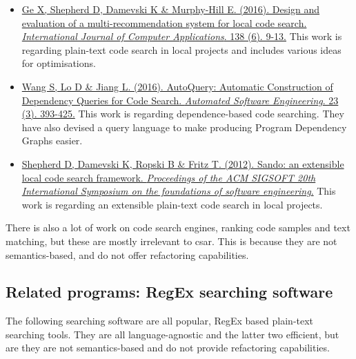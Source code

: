 \documentclass[12pt, letterpaper]{article}
\begin{document}
\begin{itemize}
  \item \href{http://www.sciencedirect.com.ezproxy.library.qmul.ac.uk/science/article/pii/S1045926X16300970?_rdoc=1&_fmt=high&_origin=gateway&_docanchor=&md5=b8429449ccfc9c30159a5f9aeaa92ffb&ccp=y}{Ge X, Shepherd D, Damevski K \& Murphy-Hill E. (2016). Design and evaluation of a multi-recommendation system for local code search. \textit{International Journal of Computer Applications}. 138 (6). 9-13.}\newline
  This work is regarding plain-text code search in local projects and includes various ideas for optimisations.
  \item \href{https://link-springer-com.ezproxy.library.qmul.ac.uk/article/10.1007%2Fs10515-014-0170-2}{Wang S, Lo D \& Jiang L. (2016). AutoQuery: Automatic Construction of Dependency Queries for Code Search. \textit{Automated Software Engineering}. 23 (3). 393-425.}\newline
  This work is regarding dependence-based code searching.
  They have also devised a query language to make producing Program Dependency Graphs easier.
  \item \href{http://dl.acm.org.ezproxy.library.qmul.ac.uk/citation.cfm?id=2393612}{Shepherd D, Damevski K, Ropski B \& Fritz T. (2012). Sando: an extensible local code search framework. \textit{Proceedings of the ACM SIGSOFT 20th International Symposium on the foundations of software engineering}.}\newline
  This work is regarding an extensible plain-text code search in local projects.
\end{itemize}

There is also a lot of work on code search engines, ranking code samples and text matching, but these are mostly irrelevant to csar.
This is because they are not semantics-based, and do not offer refactoring capabilities.

\subsection{Related programs: RegEx searching software}
The following searching software are all popular, RegEx based plain-text searching tools.
They are all language-agnostic and the latter two efficient, but are they are not semantics-based and do not provide refactoring capabilities.
\end{document}
